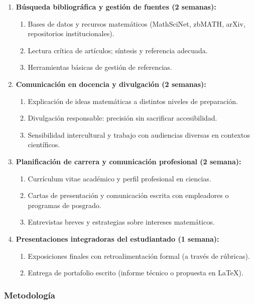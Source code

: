 \begin{refsection}
\begin{enumerate}
\item \textbf{Búsqueda bibliográfica y gestión de fuentes (2 semanas):}
\begin{enumerate}
    \item Bases de datos y recursos matemáticos (MathSciNet, zbMATH, arXiv, repositorios institucionales).
    \item Lectura crítica de artículos; síntesis y referencia adecuada.
    \item Herramientas básicas de gestión de referencias.
\end{enumerate}

\item \textbf{Comunicación en docencia y divulgación (2 semanas):}
\begin{enumerate}
    \item Explicación de ideas matemáticas a distintos niveles de preparación.
    \item Divulgación responsable: precisión sin sacrificar accesibilidad.
    \item Sensibilidad intercultural y trabajo con audiencias diversas en contextos científicos.
\end{enumerate}

\item \textbf{Planificación de carrera y comunicación profesional (2 semana):}
\begin{enumerate}
    \item Currículum vitae académico y perfil profesional en ciencias.
    \item Cartas de presentación y comunicación escrita con empleadores o programas de posgrado.
    \item Entrevistas breves y estrategias sobre intereses matemáticos.
\end{enumerate}

\item \textbf{Presentaciones integradoras del estudiantado (1 semana):}
\begin{enumerate}
    \item Exposiciones finales con retroalimentación formal (a través de rúbricas).
    \item Entrega de portafolio escrito (informe técnico o propuesta en \LaTeX{}).
\end{enumerate}

\end{enumerate}

\subsubsection*{Metodología}


\end{refsection}
